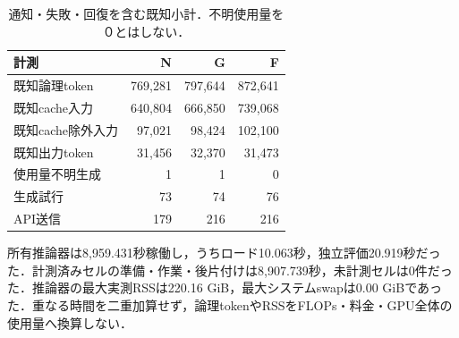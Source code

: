 \begin{table}[tb]
\centering\footnotesize\setlength{\tabcolsep}{3pt}
\caption{通知・失敗・回復を含む既知小計．不明使用量を０とはしない．}
\begin{tabular}{lrrr}
計測 & N & G & F \\ \hline
既知論理token & 769,281 & 797,644 & 872,641 \\
既知cache入力 & 640,804 & 666,850 & 739,068 \\
既知cache除外入力 & 97,021 & 98,424 & 102,100 \\
既知出力token & 31,456 & 32,370 & 31,473 \\
使用量不明生成 & 1 & 1 & 0 \\
生成試行 & 73 & 74 & 76 \\
API送信 & 179 & 216 & 216 \\
\hline\end{tabular}
\end{table}
所有推論器は8,959.431秒稼働し，うちロード10.063秒，独立評価20.919秒だった．計測済みセルの準備・作業・後片付けは8,907.739秒，未計測セルは0件だった．推論器の最大実測RSSは220.16 GiB，最大システムswapは0.00 GiBであった．重なる時間を二重加算せず，論理tokenやRSSをFLOPs・料金・GPU全体の使用量へ換算しない．
